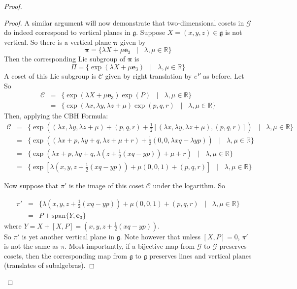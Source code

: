 \documentclass[honours]{UNSWthesis}
\newcommand{\R}{\mathbb{R}}
\newcommand{\G}{\mathcal{G}}
\newcommand{\g}{\mathfrak{g}}
\newcommand{\1}{\mathbf{e}_{1}}
\newcommand{\2}{\mathbf{e}_{3}}
\newcommand{\3}{\mathbf{e}_{3}}
\begin{document}
\begin{proof}
\begin{proof}
A similar argument will now demonstrate that two-dimensional cosets in $\G$ do indeed correspond to vertical planes in $\g$.
Suppose $X=(x,y,z) \in \g$ is not vertical. So there is a vertical plane $\mathbf{\pi}$ given by 
\[
\mathbf{\pi} = \{\lambda X + \mu \3 \;\;\;|\;\;\; \lambda,\mu \in \R \}
\]
Then the corresponding Lie subgroup of $\mathbf{\pi}$ is 
\[
\Pi = \{\exp(\lambda X + \mu \3) \;\;\;|\;\;\; \lambda,\mu \in \R \}
\]
A coset of this Lie subgroup is $\mathcal{C}$ given by right translation by $e^{P}$ as before. Let So 
\begin{eqnarray*}
\mathcal{C} &=& \{\exp(\lambda X + \mu \3)\exp (P) \;\;\;|\;\;\; \lambda,\mu \in \R \} \\
&=& \{ \exp(\lambda x, \lambda y, \lambda z +\mu)\exp(p,q,r)\;\;\;|\;\;\; \lambda,\mu \in \R \} 
\end{eqnarray*}
Then, applying the CBH Formula:
\begin{eqnarray*}
\mathcal{C}&=&  \{ \exp((\lambda x, \lambda y, \lambda z +\mu)+(p,q,r)+\frac{1}{2}[(\lambda x, \lambda y, \lambda z +\mu),(p,q,r)])\;\;\;|\;\;\; \lambda,\mu \in \R \} \\
&=& \{ \exp ((\lambda x+p, \lambda y+q, \lambda z +\mu +r)+ \frac{1}{2}(0,0,\lambda xq -\lambda yp))\;\;\;|\;\;\; \lambda,\mu \in \R \} \\
&=& \{ \exp (\lambda x+p, \lambda y+q, \lambda (z+\frac{1}{2}(xq-yp)) +\mu +r)\;\;\;|\;\;\; \lambda,\mu \in \R \} \\
&=& \{ \exp [\lambda( x, y, z+\frac{1}{2}(xq-yp))+\mu(0,0,1)+(p,q,r)]\;\;\;|\;\;\; \lambda,\mu \in \R \}
\end{eqnarray*}

Now suppose that $\pi'$ is the image of this coset $\mathcal{C}$ under the logarithm. So 

\begin{eqnarray*}
\pi' &=& \{ \lambda( x, y, z+\frac{1}{2}(xq-yp))+\mu(0,0,1)+(p,q,r) \;\;\;|\;\;\; \lambda,\mu \in \R \} \\
&=& P+\text{span}\{Y,\3 \}
\end{eqnarray*}
where $Y=X+[X,P]=( x, y, z+\frac{1}{2}(xq-yp))$. \\
So $\pi'$ is yet another vertical plane in $\g$. Note however that unless $[X,P]=0$, $\pi'$ is not the same as $\pi$. Most importantly, if a bijective map from $\G$ to $\G$ preserves cosets, then the corresponding map from $\g$ to $\g$ preserves lines and vertical planes (translates of subalgebras).
\end{proof}


\end{proof}
\end{document}
